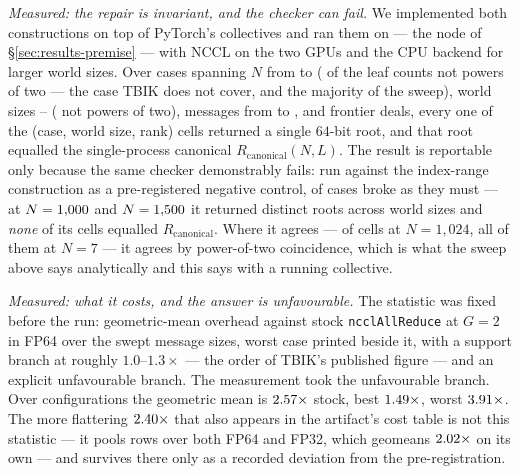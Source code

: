 \documentclass[journal,10pt]{IEEEtran}
\theoremstyle{plain}
\theoremstyle{definition}
\theoremstyle{remark}
\newcommand{\Rcan}{\ensuremath{R_{\mathrm{canonical}}}}
\begin{document}
\emph{Measured: the repair is invariant, and the checker can fail.} We
implemented both constructions on top of PyTorch's collectives and ran them on
\GpuHardware{} --- the node of \S\ref{sec:results-premise} --- with NCCL on the
two GPUs and the CPU backend for larger world sizes. Over \PinCases{} cases
spanning $N$ from \PinLeafLo{} to \PinLeafHi{} (\PinNpowLeaf{} of the leaf
counts not powers of two --- the case TBIK does not cover, and the majority of
the sweep), world sizes \PinWorldLo{}--\PinWorldHi{} (\PinNpowWorld{} not
powers of two), messages from \PinMsgLo{} to \PinMsgHi{}, and \PinDeals{}
frontier deals, every one of the \PinCells{}
(case, world size, rank) cells returned a single $64$-bit root, and that root
equalled the single-process canonical $\Rcan(N,L)$. The result is reportable only because the same checker demonstrably fails: run against the index-range construction as a
pre-registered negative control, \PinNegFired{} of \PinNegCases{} cases broke
as they must --- at $N=1{,}000{}$ and $N=1{,}500{}$ it returned
\PinNegDistinct{} distinct roots across world sizes \PinNegWorlds{} and
\emph{none} of its \PinNegCells{} cells equalled $\Rcan$. Where it agrees ---
\PinNegPartial{} of \PinNegCells{} cells at $N=1{,}024$, all of them at
$N=7$ --- it agrees by power-of-two coincidence, which is what the sweep above
says analytically and this says with a running collective.

\emph{Measured: what it costs, and the answer is unfavourable.} The statistic
was fixed before the run: geometric-mean overhead against stock
\texttt{ncclAllReduce} at $G=2$ in FP64 over the swept message sizes, worst
case printed beside it, with a support branch at roughly $1.0$--$1.3\times$ ---
the order of TBIK's published figure --- and an explicit unfavourable branch.
The measurement took the unfavourable branch. Over \PinCostCells{}
configurations the geometric mean is $2.57\times$ stock, best
$1.49\times$, worst $3.91\times$. The more flattering
$2.40\times$ that also appears in the artifact's cost table is not
this statistic --- it pools \PinCostPooledCells{} rows over both FP64 and FP32,
which geomeans $2.02\times$ on its own --- and survives there only as a
recorded deviation from the pre-registration.
\end{document}
